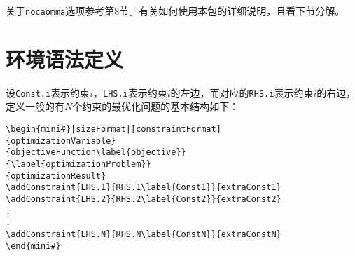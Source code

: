 \documentclass[UTF8]{ctexart}
\begin{document}
关于\texttt{nocaomma}选项参考第8节。有关如何使用本包的详细说明，且看下节分解。

\section{环境语法定义}
设\texttt{Const.i}表示约束$i$，\texttt{LHS.i}表示约束$i$的左边，而对应的\texttt{RHS.i}表示约束$i$的右边，定义一般的有$N$个约束的最优化问题的基本结构如下：
\begin{verbatim}
\begin{mini#}|sizeFormat|[constraintFormat]
{optimizationVariable}
{objectiveFunction\label{objective}}
{\label{optimizationProblem}}
{optimizationResult}
\addConstraint{LHS.1}{RHS.1\label{Const1}}{extraConst1}
\addConstraint{LHS.2}{RHS.2\label{Const2}}{extraConst2}
.
.
\addConstraint{LHS.N}{RHS.N\label{ConstN}}{extraConstN}
\end{mini#}
\end{verbatim}
\end{document}
